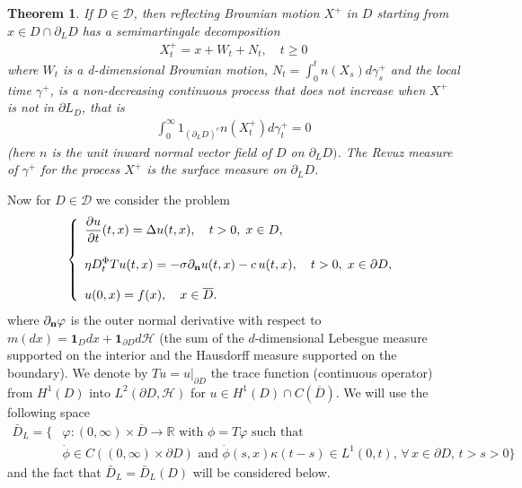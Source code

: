 \documentclass[[11pt,a4paper,reqno]{article}
\newtheorem{theorem}{Theorem}[section]
\numberwithin{equation}{section}
\begin{document}
\begin{theorem}
If $D \in  \mathcal{D}$, then reflecting Brownian motion $X^+$ in $D$ starting from $x \in D \cap \partial_L D $  has a semimartingale decomposition 
\begin{align}
X^+_t = x + W_t + N_t, \quad t\geq 0
\end{align}
where $W_t$ is a d-dimensional Brownian motion, $N_t =\int_0^t n(X_s)d\gamma^+_s$ and the local time $\gamma^+$, is a non-decreasing continuous process that does not increase when $X^+$ is not in $\partial L_D$, that is 
\begin{align*}
\int_0^\infty  1_{ (\partial_L D)^c }n(X^+_t)d\gamma^+_t=0
\end{align*}
(here $n$ is the unit inward normal vector field of $D$ on $\partial_L D)$.
The Revuz measure of $\gamma^+$ for the process $X^+$ is the surface measure on $\partial_L D$.
\end{theorem}
Now for $D \in \mathcal{D}$ we consider the problem 
\begin{align}
\left\lbrace
\begin{array}{l}
\displaystyle \frac{\partial u}{\partial t}(t,x) = \Delta u(t,x), \quad t>0, \; x \in D, \\
\\
\displaystyle \eta D^\Phi_t Tu(t,x) = - \sigma \partial_{\bf n} u(t,x) - c \, u(t,x), \quad t>0, \; x \in \partial D,\\
\\
\displaystyle u(0,x) = f(x), \quad x \in \overline{D}.
\end{array}
\right .
\label{probXbar}
\end{align}
where $\partial_{\bf n}\varphi$ is the outer normal derivative with respect to $m(dx) = \mathbf{1}_D dx + \mathbf{1}_{\partial D} d\mathcal{H}$ (the sum of the $d$-dimensional Lebesgue measure supported on the interior and the Hausdorff measure supported on the boundary). We denote by $Tu=u|_{\partial D}$ the trace function (continuous operator) from $H^1(D)$ into $L^2(\partial D, \mathcal{H})$ for $u \in H^1(D)\cap C(\overline{D})$. We will use the following space
\begin{align*}
\bar{D}_L = \bigg\{ & \varphi: (0, \infty) \times \overline{D} \to \mathbb{R} \textrm{ with } \phi= T\varphi \textrm{ such that } \\ 
 &  \dot{\phi} \in C((0, \infty) \times \partial D)  \textrm{ and }  \dot{\phi}(s, x) \kappa(t-s) \in L^1(0, t),\, \forall\, x \in \partial D,\,  t>s>0 \bigg\}
\end{align*}
and the fact that $\bar{D}_L=\bar{D}_L(D)$ will be considered below.
\end{document}
